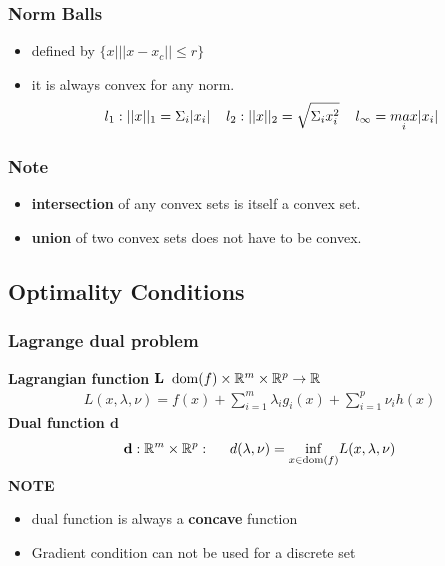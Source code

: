 \subsubsection{Norm Balls}
\begin{itemize}
    \item defined by $\{x|||x-x_c|| \leq r\}$
    \item it is always convex for any norm. 
    \[l_1: ||x||_1 = \Sigma_i|x_i| \hspace{4mm} l_2: ||x||_2 = \sqrt{\Sigma_ix_i^2} \hspace{4mm} l_\infty = \underset{i}{max}|x_i|\]
\end{itemize}
\subsubsection{Note}
\begin{itemize}
    \item \textbf{intersection} of any convex sets is itself a convex set.
    \item \textbf{union} of two convex sets does not have to be convex.
\end{itemize}

\subsection{Optimality Conditions}
\subsubsection{Lagrange dual problem}
\textbf{Lagrangian function}
    $\mathbf{L \hspace{2mm}}\mathrm{dom}(f) \times \mathbb{R}^m \times \mathbb{R}^p \rightarrow \mathbb{R}$
\begin{gather*}
    L(x,\lambda,\nu) = f(x) + \sum^m_{i=1} \lambda_i g_i(x)+\sum^p_{i=1}\nu_ih(x)
\end{gather*}
\textbf{Dual function $\mathbf{d}$}
\begin{gather*}
    \mathbf{d}: \mathbb{R}^m\times \mathbb{R}^p: \hspace{5mm} d(\lambda,\nu) = \underset{x\in\mathrm{dom}(f)}{\mathrm{inf}}L(x,\lambda,\nu)
\end{gather*}
\textbf{NOTE}
\begin{itemize}
    \item dual function is always a \textbf{concave} function
    \item Gradient condition can not be used for a discrete set
\end{itemize}
